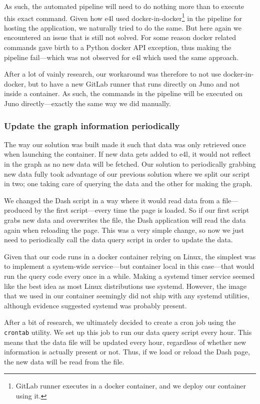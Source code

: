 As such, the automated pipeline will need to do nothing more than to
execute this exact command. Given how \gls{e4l} used
docker-in-docker\footnote{GitLab runner executes in a docker
container, and we deploy our container using it.} in the pipeline for
hosting the application, we naturally tried to do the same. But here
again we encountered an issue that is still not solved. For some
reason docker related commands gave birth to a Python docker API
exception, thus making the pipeline fail---which was not observed for
\gls{e4l} which used the same approach.

After a lot of vainly research, our workaround was therefore to not
use docker-in-docker, but to have a new GitLab runner that runs
directly on Juno and not inside a container. As such, the commands in
the pipeline will be executed on Juno directly---exactly the same way
we did manually.

\subsubsection{Update the graph information periodically}

The way our solution was built made it such that data was only
retrieved once when launching the container. If new data gets added to
\gls{e4l}, it would not reflect in the graph as no new data will be
fetched. Our solution to periodically grabbing new data fully took
advantage of our previous solution where we split our script in two;
one taking care of querying the data and the other for making the
graph.

We changed the Dash script in a way where it would read data from a
file---produced by the first script---every time the page is loaded.
So if our first script grabs new data and overwrites the file, the
Dash application will read the data again when reloading the page.
This was a very simple change, so now we just need to periodically
call the data query script in order to update the data.

Given that our code runs in a docker container relying on Linux, the
simplest was to implement a system-wide service---but container local
in this case---that would run the query code every once in a while.
Making a systemd timer service seemed like the best idea as most Linux
distributions use systemd. However, the image that we used in our
container seemingly did not ship with any systemd utilities, although
evidence suggested systemd was probably present.

After a bit of research, we ultimately decided to create a cron job
using the \verb|crontab| utility. We set up this job to run our data
query script every hour. This means that the data file will be updated
every hour, regardless of whether new information is actually present
or not. Thus, if we load or reload the Dash page, the new data will be
read from the file.

